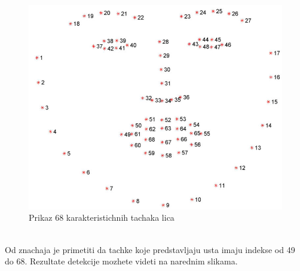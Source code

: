 \documentclass[a4paper, openany, oneside, 11pt]{book}
\begin{document}
\begin{figure}[h!]
\centering
  \includegraphics[scale=0.25]{res/facial_landmarks_68markup.jpg}
  \caption{Prikaz 68 karakteristichnih tachaka lica \protect\footnotemark}
  \label{fig:2_4}
  \vspace{0pt}
\end{figure}\\
Od znachaja je primetiti da tachke koje predstavljaju usta imaju indekse od 49 do 68. Rezultate detekcije mozhete videti na narednim slikama.
\end{document}

